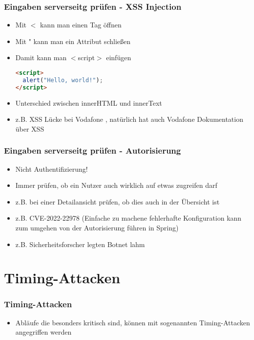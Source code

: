 \documentclass[ngerman2]{beamer}
\begin{document}
\begin{frame}[fragile]
\frametitle{Eingaben serverseitg prüfen - XSS Injection}
  \begin{itemize}
		\item Mit $<$ kann man einen Tag öffnen
		\item Mit " kann man ein Attribut schließen
		\item Damit kann man $<$script$>$ einfügen\
			\begin{lstlisting}[language=HTML]
<script>
  alert("Hello, world!");
</script>
			\end{lstlisting}
    \item Unterschied zwischen innerHTML und innerText
    \item z.B. XSS Lücke bei Vodafone
      \cite{vodafonexssattack},
      natürlich hat auch Vodafone Dokumentation über XSS
      \cite{vodafonexssattackdoc}
  \end{itemize}
\end{frame}

\begin{frame}[fragile]
\frametitle{Eingaben serverseitg prüfen - Autorisierung}
  \begin{itemize}
    \item Nicht Authentifizierung!
		\item Immer prüfen, ob ein Nutzer auch wirklich auf etwas zugreifen darf
    \item z.B. bei einer Detailansicht prüfen, ob dies auch in der Übersicht ist
    \item z.B. CVE-2022-22978
      (Einfache zu machene fehlerhafte Konfiguration kann zum umgehen von der Autorisierung führen in Spring)
      \cite{CVE202222978}
		\item z.B. Sicherheitsforscher legten Botnet lahm
			\cite{heisebotnet}
  \end{itemize}
\end{frame}

\section{Timing-Attacken}

\begin{frame}[fragile]
\frametitle{Timing-Attacken}
  \begin{itemize}
		\item Abläufe die besonders kritisch sind, können mit sogenannten Timing-Attacken angegriffen werden
  \end{itemize}
\end{frame}
\end{document}
